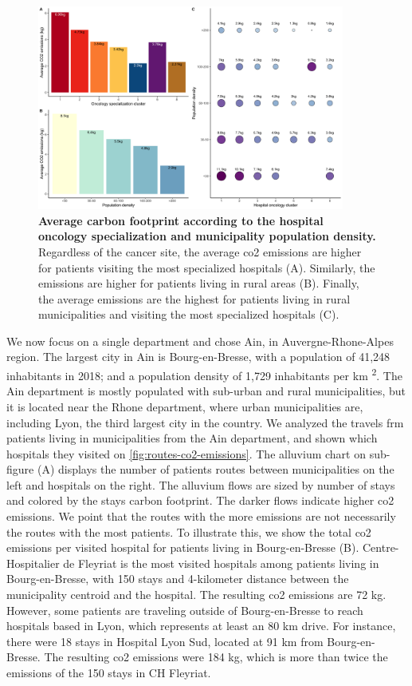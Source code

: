 \begin{figure}[h!]
    \includegraphics[width=0.9\textwidth]{images/routes/sup_fig_5.png}
    \centering
    \caption{ \textbf{Average carbon footprint according to the hospital
            oncology specialization and municipality population density.} Regardless
        of the cancer site, the average \ac{co2} emissions are higher for
        patients visiting the most specialized hospitals (A). Similarly,
        the emissions are higher for patients living in rural areas (B).
        Finally, the average emissions are the highest for patients living in
        rural municipalities and visiting the most specialized hospitals (C).}
    \label{fig:avg-carbon-footprint-density-cluster}
\end{figure}

We now focus on a single department and chose Ain, in Auvergne-Rhone-Alpes
region. The largest city in Ain is Bourg-en-Bresse, with a population of 41,248
inhabitants in 2018; and a population density of 1,729 inhabitants per km
\textsuperscript{2}. The Ain department is mostly populated with sub-urban and
rural municipalities, but it is located near the Rhone department, where urban
municipalities are, including Lyon, the third largest city in the country. We
analyzed the travels frm patients living in municipalities from the Ain
department, and shown which hospitals they visited on
\cref{fig:routes-co2-emissions}. The alluvium chart on sub-figure (A) displays
the number of patients routes between municipalities on the left and hospitals
on the right. The alluvium flows are sized by number of stays and colored by the
stays carbon footprint. The darker flows indicate higher \ac{co2} emissions. We
point that the routes with the more emissions are not necessarily the routes
with the most patients. To illustrate this, we show the total \ac{co2} emissions
per visited hospital for patients living in Bourg-en-Bresse (B).
Centre-Hospitalier de Fleyriat is the most visited hospitals among patients
living in Bourg-en-Bresse, with 150 stays and 4-kilometer distance between the
municipality centroid and the hospital. The resulting \ac{co2} emissions are 72
kg. However, some patients are traveling outside of Bourg-en-Bresse to reach
hospitals based in Lyon, which represents at least an 80 km drive. For instance,
there were 18 stays in Hospital Lyon Sud, located at 91 km from Bourg-en-Bresse.
The resulting \ac{co2} emissions were 184 kg, which is more than twice the
emissions of the 150 stays in CH Fleyriat.

